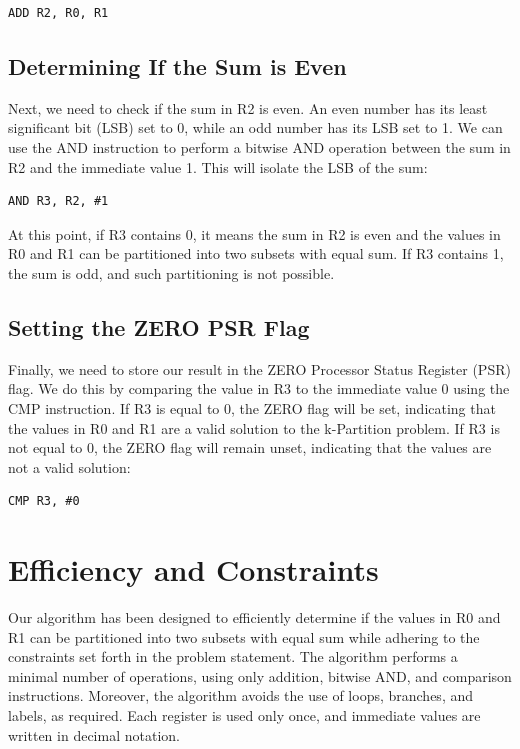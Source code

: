 \begin{verbatim}
ADD R2, R0, R1
\end{verbatim}

\subsection{Determining If the Sum is Even}
Next, we need to check if the sum in R2 is even. An even number has its least significant bit (LSB) set to 0, while an odd number has its LSB set to 1. We can use the AND instruction to perform a bitwise AND operation between the sum in R2 and the immediate value 1. This will isolate the LSB of the sum:

\begin{verbatim}
AND R3, R2, #1
\end{verbatim}

At this point, if R3 contains 0, it means the sum in R2 is even and the values in R0 and R1 can be partitioned into two subsets with equal sum. If R3 contains 1, the sum is odd, and such partitioning is not possible.

\subsection{Setting the ZERO PSR Flag}
Finally, we need to store our result in the ZERO Processor Status Register (PSR) flag. We do this by comparing the value in R3 to the immediate value 0 using the CMP instruction. If R3 is equal to 0, the ZERO flag will be set, indicating that the values in R0 and R1 are a valid solution to the k-Partition problem. If R3 is not equal to 0, the ZERO flag will remain unset, indicating that the values are not a valid solution:

\begin{verbatim}
CMP R3, #0
\end{verbatim}

\section{Efficiency and Constraints}
Our algorithm has been designed to efficiently determine if the values in R0 and R1 can be partitioned into two subsets with equal sum while adhering to the constraints set forth in the problem statement. The algorithm performs a minimal number of operations, using only addition, bitwise AND, and comparison instructions. Moreover, the algorithm avoids the use of loops, branches, and labels, as required. Each register is used only once, and immediate values are written in decimal notation.

